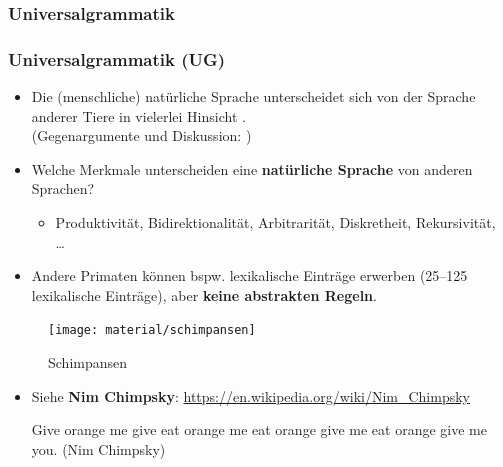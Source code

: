 \subsubsection{Universalgrammatik}


\begin{frame}
\frametitle{Universalgrammatik (UG)}

\begin{itemize}

	\item Die (menschliche) natürliche Sprache unterscheidet sich von der Sprache anderer Tiere in vielerlei Hinsicht \citep[vgl. \zB][]{Hockett60a-removed, Pinker95a}.\\
	(Gegenargumente und Diskussion: \citealt{Evans&Levinson09a, MuellerS15b})
	\medskip
	\item Welche Merkmale unterscheiden eine \textbf{natürliche Sprache} von anderen Sprachen? 
	\begin{itemize}
		\item Produktivität, Bidirektionalität, Arbitrarität, Diskretheit, Rekursivität, \dots\ \citep[vgl.][]{Hockett60a-removed, Luedeling2009a}
	\end{itemize}


	\medskip
	\item Andere Primaten können bspw. lexikalische Einträge erwerben (25--125 lexikalische Einträge), aber \textbf{keine abstrakten Regeln}.
\end{itemize}

\end{frame}


\begin{frame}

\begin{figure}
\centering
	\texttt{[image: material/schimpansen]}
	\caption{Schimpansen}
\end{figure}

\begin{itemize}
	\item Siehe \textbf{Nim Chimpsky}: \url{https://en.wikipedia.org/wiki/Nim_Chimpsky}

	\ea Give orange me give eat orange me eat orange give me eat orange give me you. \hfill (Nim Chimpsky)
	\z
\end{itemize}


\end{frame}


